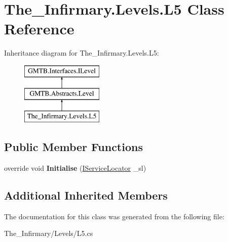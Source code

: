 \hypertarget{class_the___infirmary_1_1_levels_1_1_l5}{}\section{The\+\_\+\+Infirmary.\+Levels.\+L5 Class Reference}
\label{class_the___infirmary_1_1_levels_1_1_l5}
Inheritance diagram for The\+\_\+\+Infirmary.\+Levels.\+L5\+:\begin{figure}[H]
\begin{center}
\leavevmode
\includegraphics[height=3.000000cm]{class_the___infirmary_1_1_levels_1_1_l5}
\end{center}
\end{figure}
\subsection*{Public Member Functions}
\begin{DoxyCompactItemize}
\item 
\mbox{\label{class_the___infirmary_1_1_levels_1_1_l5_ae27f4406b6d74c7634d3f42a26526650}} 
override void {\bfseries Initialise} (\mbox{\hyperlink{interface_g_m_t_b_1_1_interfaces_1_1_i_service_locator}{I\+Service\+Locator}} \+\_\+sl)
\end{DoxyCompactItemize}
\subsection*{Additional Inherited Members}


The documentation for this class was generated from the following file\+:\begin{DoxyCompactItemize}
\item 
The\+\_\+\+Infirmary/\+Levels/L5.\+cs\end{DoxyCompactItemize}
